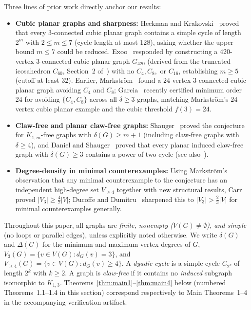 \documentclass[11pt,reqno]{amsart}
\theoremstyle{plain}
\theoremstyle{definition}
\theoremstyle{remark}
\newcommand{\Vge}{V_{\ge 4}}
\newcommand{\EG}{\text{Erd\H{o}s--Gy\'arf\'as}}
\DeclareRobustCommand{\_}{\ifmmode\text{\textunderscore}\else\textunderscore\allowbreak\fi}
\begin{document}
Three lines of prior work directly anchor our results:
\begin{itemize}[leftmargin=1.8em]
  \item \textbf{Cubic planar graphs and sharpness:} Heckman and Krakovski~\cite{HeckmanKrakovski2013} proved that every $3$-connected cubic planar graph contains a simple cycle of length $2^m$ with $2 \le m \le 7$ (cycle length at most $128$), asking whether the upper bound $m \le 7$ could be reduced. Exoo~\cite{Exoo2014} responded by constructing a $420$-vertex $3$-connected cubic planar graph $G_{420}$ (derived from the truncated icosahedron $C_{60}$, Section~2 of~\cite{Exoo2014}) with no $C_4, C_8,$ or $C_{16}$, establishing $m \ge 5$ (cutoff at least $32$). Earlier, Markstr\"om~\cite{Markstrom2004} found a $24$-vertex $3$-connected cubic planar graph avoiding $C_4$ and $C_8$; Garcia~\cite{Garcia2026} recently certified minimum order $24$ for avoiding $\{C_4, C_8\}$ across all $\delta \ge 3$ graphs, matching Markstr\"om's $24$-vertex cubic planar example and the cubic threshold $f(3) = 24$.
  \item \textbf{Claw-free and planar claw-free graphs:} Shauger~\cite{Shauger1998} proved the conjecture for $K_{1,m}$-free graphs with $\delta(G) \ge m + 1$ (including claw-free graphs with $\delta \ge 4$), and Daniel and Shauger~\cite{DanielShauger2001} proved that every planar induced claw-free graph with $\delta(G) \ge 3$ contains a power-of-two cycle (see also~\cite{HeckmanKrakovski2013}).
  \item \textbf{Degree-density in minimal counterexamples:} Using Markstr\"om's~\cite{Markstrom2004} observation that any minimal counterexample to the \EG{} conjecture has an independent high-degree set $\Vge$ together with new structural results, Carr~\cite{Carr2026} proved $|V_3| \ge \frac{4}{7}|V|$; Ducoffe and Dumitru~\cite{DucoffeDumitru2026} sharpened this to $|V_3| > \frac{2}{3}|V|$ for minimal counterexamples generally.
\end{itemize}

Throughout this paper, all graphs are \emph{finite, nonempty ($V(G) \neq \emptyset$), and simple} (no loops or parallel edges), unless explicitly noted otherwise. We write $\delta(G)$ and $\Delta(G)$ for the minimum and maximum vertex degrees of $G$, $V_3(G) = \{v \in V(G) : d_G(v) = 3\}$, and $\Vge(G) = \{v \in V(G) : d_G(v) \ge 4\}$. A \emph{dyadic cycle} is a simple cycle $C_{2^k}$ of length $2^k$ with $k \ge 2$. A graph is \emph{claw-free} if it contains no \emph{induced} subgraph isomorphic to $K_{1,3}$. Theorems~\ref{thm:main1}--\ref{thm:main4} below (numbered Theorems~1.1--1.4 in this section) correspond respectively to Main Theorems~1--4 in the accompanying verification artifact.
\end{document}
